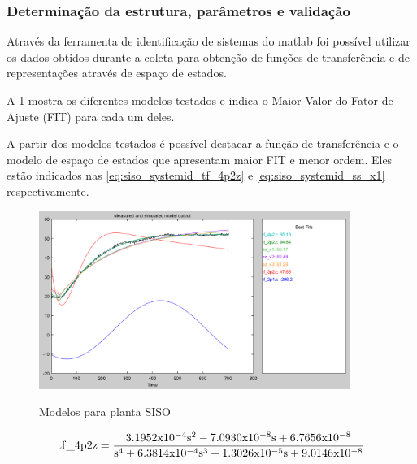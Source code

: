 \subsubsection{Determinação da estrutura, parâmetros e validação}
\label{subsubsec:siso_identificacao_do_modelo_estrutura}

Através da ferramenta de identificação de sistemas do \acrshort{matlab} foi possível utilizar
os dados obtidos durante a coleta para obtenção de funções de transferência e de representações
através de espaço de estados.

A \cref{fig:siso_systemid_fit} mostra os diferentes modelos testados e indica o Maior Valor do
Fator de Ajuste (FIT) para cada um deles.

A partir dos modelos testados é possível destacar a função de transferência e o modelo de espaço
de estados que apresentam maior FIT e menor ordem. Eles estão indicados nas
\cref{eq:siso_systemid_tf_4p2z} e \cref{eq:siso_systemid_ss_x1} respectivamente.

\begin{figure}
    \caption{Modelos para planta SISO}
	\begin{center}
		\includegraphics[width=0.9\textwidth]{./5_images/Exp_106_ModelOutput_All.png} 
		\label{fig:siso_systemid_fit}
	\end{center}
    \centering
\end{figure}

\begin{equation}
	\label{eq:siso_systemid_tf_4p2z}
    \mathrm{tf\_4p2z} = \dfrac{\\
            3.1952 \mathrm{x10^{-4} s^2} - 7.0930 \mathrm{x10^{-8} s} + 6.7656 \mathrm{x10^{-8}}\\
            }{\\
            \mathrm{s^4} + 6.3814 \mathrm{x10^{-4} s^3} + 1.3026 \mathrm{x10^{-5} s} + 9.0146 \mathrm{x10^{-8}}\\
            }
\end{equation}

